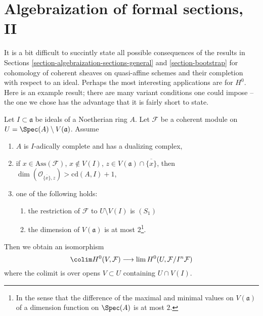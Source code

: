 \section{Algebraization of formal sections, II}
\label{section-algebraization-sections-coherent}

\noindent
It is a bit difficult to succintly state all possible
consequences of the results in
Sections \ref{section-algebraization-sections-general} and
\ref{section-bootstrap}
for cohomology of coherent sheaves on quasi-affine schemes
and their completion with respect to an ideal.
Perhaps the most interesting applications are for $H^0$.
Here is an example result; there are many variant conditions
one could impose -- the one we chose has the advantage that
it is fairly short to state.

\begin{proposition}
\label{proposition-application-H0}
Let $I \subset \mathfrak a$ be ideals of a Noetherian ring $A$.
Let $\mathcal{F}$ be a coherent module on
$U = \Spec(A) \setminus V(\mathfrak a)$.
Assume
\begin{enumerate}
\item $A$ is $I$-adically complete and has a dualizing complex,
\item if $x \in \text{Ass}(\mathcal{F})$, $x \not \in V(I)$,
$z \in V(\mathfrak a) \cap \overline{\{x\}}$, then
$\dim(\mathcal{O}_{\overline{\{x\}}, z}) > \text{cd}(A, I) + 1$,
\item one of the following holds:
\begin{enumerate}
\item the restriction of $\mathcal{F}$ to $U \setminus V(I)$ is $(S_1)$
\item the dimension of $V(\mathfrak a)$ is at most $2$\footnote{In
the sense that the difference of the maximal and minimal values
on $V(\mathfrak a)$ of a dimension function on $\Spec(A)$ is at most $2$.}.
\end{enumerate}
\end{enumerate}
Then we obtain an isomorphism
$$
\colim H^0(V, \mathcal{F})
\longrightarrow
\lim H^0(U, \mathcal{F}/I^n\mathcal{F})
$$
where the colimit is over opens $V \subset U$ containing $U \cap V(I)$.
\end{proposition}

